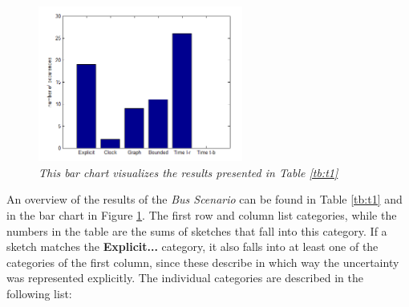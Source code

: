 \begin{figure}[H]
	\centering
	\includegraphics[width=0.6\textwidth]{figures/barT1.PNG}
	\caption{\textit{This bar chart visualizes the results presented in Table \ref{tb:t1}}}
	\label{fig:t1bar}
\end{figure}

An overview of the results of the \textit{Bus Scenario} can be found in Table \ref{tb:t1} and in the bar chart in Figure \ref{fig:t1bar}. The first row and column list categories, while the numbers in the table are the sums of sketches that fall into this category. If a sketch matches the \textbf{Explicit...} category, it also falls into at least one of the categories of the first column, since these describe in which way the uncertainty was represented explicitly. The individual categories are described in the following list:

